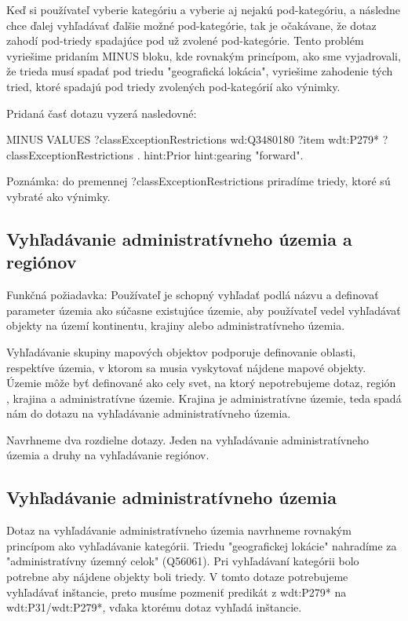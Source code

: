Keď si používateľ vyberie kategóriu a vyberie aj nejakú pod-kategóriu, a následne chce ďalej vyhľadávať ďalšie možné pod-kategórie, tak
je očakávane, že dotaz zahodí pod-triedy spadajúce pod už zvolené pod-kategórie. Tento problém vyriešime
pridaním MINUS bloku, kde rovnakým princípom, ako sme vyjadrovali, že trieda musí spadať pod triedu "geografická lokácia",
vyriešime zahodenie tých tried, ktoré spadajú pod triedy zvolených pod-kategórií ako výnimky.

Pridaná časť dotazu vyzerá nasledovné:
\begin{code}
      MINUS{
      VALUES ?classExceptionRestrictions {wd:Q3480180  }
      ?item wdt:P279* ?classExceptionRestrictions .
      hint:Prior hint:gearing "forward".
      }
\end{code}
Poznámka: do premennej ?classExceptionRestrictions priradíme triedy, ktoré sú vybraté ako výnimky.

\subsection{Vyhľadávanie administratívneho územia a regiónov}
Funkčná požiadavka: Používateľ je schopný vyhľadať podlá názvu a definovať parameter územia ako súčasne existujúce územie, aby používateľ vedel vyhľadávať objekty
na území kontinentu, krajiny alebo administratívneho územia.

Vyhľadávanie skupiny mapových objektov podporuje definovanie oblasti, respektíve územia, v ktorom sa musia vyskytovať nájdene mapové objekty.
Územie môže byť definované ako cely svet, na ktorý nepotrebujeme dotaz, región , krajina a administratívne územie.
Krajina je administratívne územie, teda spadá nám do dotazu na vyhľadávanie administratívneho územia.

Navrhneme dva rozdielne dotazy. Jeden na vyhľadávanie administratívneho územia a druhy na vyhľadávanie regiónov.

\subsection*{Vyhľadávanie administratívneho územia }
Dotaz na vyhľadávanie administratívneho územia navrhneme rovnakým princípom ako vyhľadávanie kategórii.
Triedu "geografickej lokácie" nahradíme za "administratívny územný celok" (Q56061). Pri vyhľadávaní kategórii bolo
potrebne aby nájdene objekty boli triedy. V tomto dotaze potrebujeme vyhľadávať inštancie, preto musíme pozmeniť predikát
z wdt:P279* na wdt:P31/wdt:P279*, vďaka ktorému dotaz vyhľadá inštancie.

